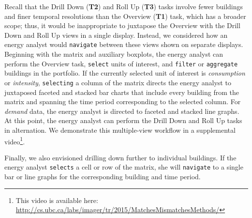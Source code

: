 \begin{sloppypar}
Recall that the Drill Down ({\bf T2}) and Roll Up ({\bf T3}) tasks involve fewer buildings and finer temporal resolutions than the Overview ({\bf T1}) task, which has a broader scope; 
thus, it would be inappropriate to juxtapose the Overview with the Drill Down and Roll Up views in a single display.
Instead, we considered how an energy analyst would {\tt navigate} between these views shown on separate displays.
Beginning with the matrix and auxiliary boxplots, the energy analyst can perform the Overview task, {\tt select} units of interest, and {\tt filter} or {\tt aggregate} buildings in the portfolio. 
If the currently selected unit of interest is {\it consumption} or {\it intensity}, {\tt selecting} a column of the matrix directs the energy analyst to juxtaposed faceted and stacked bar charts that include every building from the matrix and spanning the time period corresponding to the selected column. 
For {\it demand} data, the energy analyst is directed to faceted and stacked line graphs.
At this point, the energy analyst can perform the Drill Down and Roll Up tasks in alternation.
We demonstrate this multiple-view workflow in a supplemental video\footnote{This video is available here: \url{http://cs.ubc.ca/labs/imager/tr/2015/MatchesMismatchesMethods/}}.
\end{sloppypar}

Finally, we also envisioned drilling down further to individual buildings. 
If the energy analyst {\tt selects} a cell or row of the matrix, she will {\tt navigate} to a single bar or line graphs for the corresponding building and time period.



